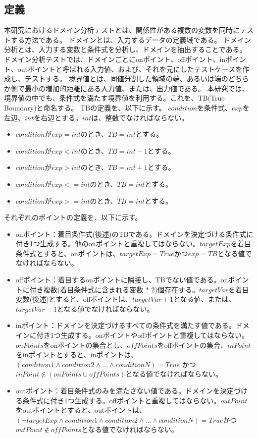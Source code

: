 \documentclass[uplatex, report, a4j, 10pt]{jsbook}
\begin{document}
\subsection{定義}\label{sec:define}
本研究におけるドメイン分析テストとは、関係性がある複数の変数を同時にテストする方法である\cite{izon}\cite{jstqb}。
ドメインとは、入力するデータの定義域である。
ドメイン分析とは、入力する変数と条件式を分析し、ドメインを抽出することである。
ドメイン分析テストでは、ドメインごとにonポイント、offポイント、inポイント、outポイントと呼ばれる入力値、および、それを元にしたテストケースを作成し、テストする。
境界値とは、同値分割した領域の端、あるいは端のどちらか側で最小の増加的距離にある入力値、または、出力値である\cite{jstqb}。
本研究では、境界値の中でも、条件式を満たす境界値を利用する。これを、TB(True Boundary)と命名する。
TBの定義を、以下に示す。
$condition$を条件式、$exp$を左辺、$int$を右辺とする。$int$は、整数でなければならない。
\begin{itemize}
  \item $condition$が$exp = int$のとき、$TB = int$とする。
  \item $condition$が$exp < int$のとき、$TB = int - 1$とする。
  \item $condition$が$exp > int$のとき、$TB = int + 1$とする。
  \item $condition$が$exp <= int$のとき、$TB = int$とする。
  \item $condition$が$exp >= int$のとき、$TB = int$とする。
\end{itemize}
それぞれのポイントの定義を、以下に示す。
\begin{itemize}
  \item onポイント：着目条件式(後述)のTBである。ドメインを決定づける条件式に付き1つ生成する。他のonポイントと重複してはならない。$targetExp$を着目条件式とすると、onポイントは、$targetExp = True$かつ$exp = TB$となる値でなければならない。
  \item offポイント：着目するonポイントに隣接し、TBでない値である。onポイントに付き複数(着目条件式に含まれる変数 $*$ 2)個存在する。$targetVar$を着目変数(後述)とすると、offポイントは、$targetVar + 1$となる値、または、$targetVar - 1$となる値でなければならない。
  \item inポイント：ドメインを決定づけるすべての条件式を満たす値である。ドメインに付き1つ生成する。onポイントやoffポイントと重複してはならない。$onPoints$をonポイントの集合とし、$offPoints$をoffポイントの集合、$inPoint$をinポイントとすると、inポイントは、 $(condition1 \land condition2 \land ... \land conditionN) = True$ かつ $inPoint \notin (onPoints \cup offPoints)$となる値でなければならない。
  \item outポイント：着目条件式のみを満たさない値である。ドメインを決定づける条件式に付き1つ生成する。offポイントと重複してはならない。$outPoint$をoutポイントとすると、outポイントは、$ (\lnot targetExp \land condition1 \land condition2 \land ... \land conditionN) = True$かつ$outPoint \notin offPoints$となる値でなければならない。
\end{itemize}
\end{document}
